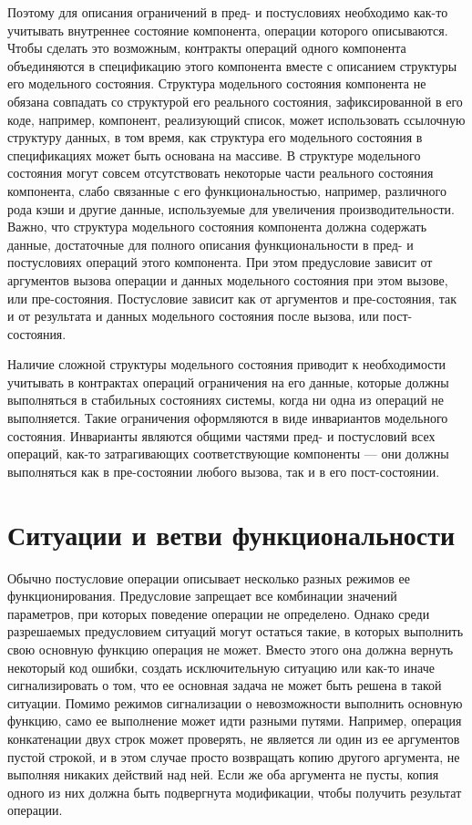 \documentclass[14pt, twoside]{extreport}
\begin{document}
Поэтому для описания ограничений в пред- и постусловиях необходимо как-то учитывать внутреннее состояние компонента, операции которого описываются. Чтобы сделать это возможным, контракты операций одного компонента объединяются в спецификацию этого компонента вместе с описанием структуры его модельного состояния. Структура модельного состояния компонента не обязана совпадать со структурой его реального состояния, зафиксированной в его коде, например, компонент, реализующий список, может использовать ссылочную структуру данных, в том время, как структура его модельного состояния в спецификациях может быть основана на массиве. В структуре модельного состояния могут совсем отсутствовать некоторые части реального состояния компонента, слабо связанные с его функциональностью, например, различного рода кэши и другие данные, используемые для увеличения производительности. Важно, что структура модельного состояния компонента должна содержать данные, достаточные для полного описания функциональности в пред- и постусловиях операций этого компонента. При этом предусловие зависит от аргументов вызова операции и данных модельного состояния при этом вызове, или пре-состояния. Постусловие зависит как от аргументов и пре-состояния, так и от результата и данных модельного состояния после вызова, или пост-состояния. 

Наличие сложной структуры модельного состояния приводит к необходимости учитывать в контрактах операций ограничения на его данные, которые должны выполняться в стабильных состояниях системы, когда ни одна из операций не выполняется. Такие ограничения оформляются в виде инвариантов модельного состояния. Инварианты являются общими частями пред- и постусловий всех операций, как-то затрагивающих соответствующие компоненты --- они должны выполняться как в пре-состоянии любого вызова, так и в его пост-состоянии.

\section{Ситуации и ветви функциональности}

Обычно постусловие операции описывает несколько разных режимов ее функционирования. Предусловие запрещает все комбинации значений параметров, при которых поведение операции не определено. Однако среди разрешаемых предусловием ситуаций могут остаться такие, в которых выполнить свою основную функцию операция не может. Вместо этого она должна вернуть некоторый код ошибки, создать исключительную ситуацию или как-то иначе сигнализировать о том, что ее основная задача не может быть решена в такой ситуации. Помимо режимов сигнализации о невозможности выполнить основную функцию, само ее выполнение может идти разными путями. Например, операция конкатенации двух строк может проверять, не является ли один из ее аргументов пустой строкой, и в этом случае просто возвращать копию другого аргумента, не выполняя никаких действий над ней. Если же оба аргумента не пусты, копия одного из них должна быть подвергнута модификации, чтобы получить результат операции.
\end{document}
